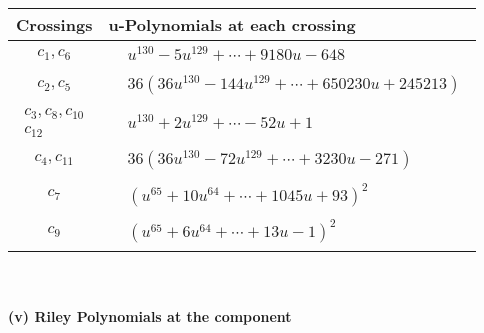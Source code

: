 \documentclass[1p]{elsarticle_modified}
\theoremstyle{definition}
\begin{document}
\begin{tabular}{m{50pt}|m{274pt}}
Crossings & \hspace{64pt}u-Polynomials at each crossing \\
\hline $$\begin{aligned}c_{1},c_{6}\end{aligned}$$&$\begin{aligned}
&u^{130}-5 u^{129}+\cdots+9180 u-648
\end{aligned}$\\
\hline $$\begin{aligned}c_{2},c_{5}\end{aligned}$$&$\begin{aligned}
&36(36 u^{130}-144 u^{129}+\cdots+650230 u+245213)
\end{aligned}$\\
\hline $$\begin{aligned}c_{3},c_{8},c_{10}\\c_{12}\end{aligned}$$&$\begin{aligned}
&u^{130}+2 u^{129}+\cdots-52 u+1
\end{aligned}$\\
\hline $$\begin{aligned}c_{4},c_{11}\end{aligned}$$&$\begin{aligned}
&36(36 u^{130}-72 u^{129}+\cdots+3230 u-271)
\end{aligned}$\\
\hline $$\begin{aligned}c_{7}\end{aligned}$$&$\begin{aligned}
&(u^{65}+10 u^{64}+\cdots+1045 u+93)^{2}
\end{aligned}$\\
\hline $$\begin{aligned}c_{9}\end{aligned}$$&$\begin{aligned}
&(u^{65}+6 u^{64}+\cdots+13 u-1)^{2}
\end{aligned}$\\
\hline
\end{tabular}\\~\\
\newpage\renewcommand{\arraystretch}{1}
\flushleft \textbf{(v) Riley Polynomials at the component}\newline \\
\end{document}
